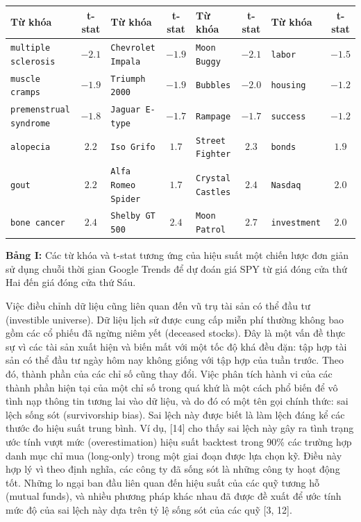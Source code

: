 \begin{table}[H]
\centering
\begin{tabular}{|l|c||l|c||l|c||l|c|}
\hline
Từ khóa & t-stat & Từ khóa & t-stat & Từ khóa & t-stat & Từ khóa & t-stat \\
\hline
\texttt{multiple sclerosis} & $-2.1$ & \texttt{Chevrolet Impala} & $-1.9$ & \texttt{Moon Buggy} & $-2.1$ & \texttt{labor} & $-1.5$ \\
\texttt{muscle cramps} & $-1.9$ & \texttt{Triumph 2000} & $-1.9$ & \texttt{Bubbles} & $-2.0$ & \texttt{housing} & $-1.2$ \\
\texttt{premenstrual syndrome} & $-1.8$ & \texttt{Jaguar E-type} & $-1.7$ & \texttt{Rampage} & $-1.7$ & \texttt{success} & $-1.2$ \\
\texttt{alopecia} & $2.2$ & \texttt{Iso Grifo} & $1.7$ & \texttt{Street Fighter} & $2.3$ & \texttt{bonds} & $1.9$ \\
\texttt{gout} & $2.2$ & \texttt{Alfa Romeo Spider} & $1.7$ & \texttt{Crystal Castles} & $2.4$ & \texttt{Nasdaq} & $2.0$ \\
\texttt{bone cancer} & $2.4$ & \texttt{Shelby GT 500} & $2.4$ & \texttt{Moon Patrol} & $2.7$ & \texttt{investment} & $2.0$ \\
\hline
\end{tabular}
\par\smallskip
{\small \textbf{Bảng I:} Các từ khóa và t-stat tương ứng của hiệu suất một chiến lược đơn giản sử dụng chuỗi thời gian Google Trends để dự đoán giá SPY từ giá đóng cửa thứ Hai đến giá đóng cửa thứ Sáu.}
\end{table}

Việc điều chỉnh dữ liệu cũng liên quan đến vũ trụ tài sản có thể đầu tư (investible universe). Dữ liệu lịch sử được cung cấp miễn phí thường không bao gồm các cổ phiếu đã ngừng niêm yết (deceased stocks). Đây là một vấn đề thực sự vì các tài sản xuất hiện và biến mất với một tốc độ khá đều đặn: tập hợp tài sản có thể đầu tư ngày hôm nay không giống với tập hợp của tuần trước. Theo đó, thành phần của các chỉ số cũng thay đổi. Việc phân tích hành vi của các thành phần hiện tại của một chỉ số trong quá khứ là một cách phổ biến để vô tình nạp thông tin tương lai vào dữ liệu, và do đó có một tên gọi chính thức: sai lệch sống sót (survivorship bias). Sai lệch này được biết là làm lệch đáng kể các thước đo hiệu suất trung bình. Ví dụ, [14] cho thấy sai lệch này gây ra tình trạng ước tính vượt mức (overestimation) hiệu suất backtest trong 90\% các trường hợp danh mục chỉ mua (long-only) trong một giai đoạn được lựa chọn kỹ. Điều này hợp lý vì theo định nghĩa, các công ty đã sống sót là những công ty hoạt động tốt. Những lo ngại ban đầu liên quan đến hiệu suất của các quỹ tương hỗ (mutual funds), và nhiều phương pháp khác nhau đã được đề xuất để ước tính mức độ của sai lệch này dựa trên tỷ lệ sống sót của các quỹ [3, 12].

